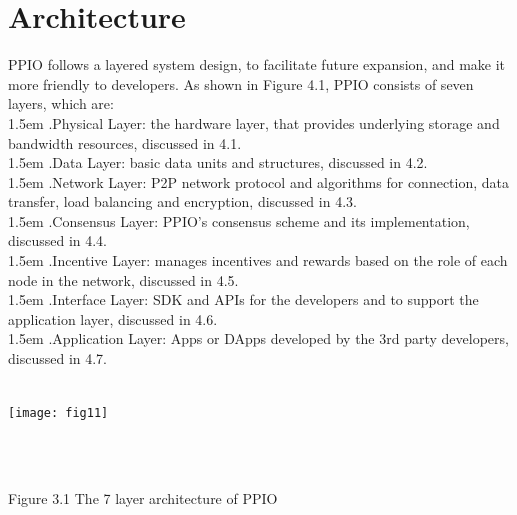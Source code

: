 \documentclass[10pt,a4paper]{article}
\begin{document}
    \section{Architecture} %
PPIO follows a layered system design, to facilitate future expansion, and make it more friendly to developers. As shown in Figure 4.1, PPIO consists of seven layers, which are:
\vspace{-0.5em}
 \\


\hangindent 1.5em
.\quad  Physical Layer: the hardware layer, that provides underlying storage and bandwidth resources, discussed in 4.1.
\vspace{-0.8em}
\\


\hangindent 1.5em
.\quad Data Layer: basic data units and structures, discussed in 4.2.
\vspace{-0.8em}
\\


\hangindent 1.5em
.\quad Network Layer: P2P network protocol and algorithms for connection, data transfer, load balancing and encryption, discussed in 4.3.
\vspace{-0.8em}
\\

\hangindent 1.5em
.\quad Consensus Layer: PPIO’s consensus scheme and its implementation, discussed in 4.4.
\vspace{-0.8em}
\\

\hangindent 1.5em
.\quad Incentive Layer: manages incentives and rewards based on the role of each node in the network, discussed in 4.5.
\vspace{-0.8em}
\\

\hangindent 1.5em
.\quad Interface Layer: SDK and APIs for the developers and to support the application layer, discussed in 4.6.
\vspace{-0.8em}
\\

\hangindent 1.5em
.\quad Application Layer: Apps or DApps developed by the 3rd party developers, discussed in 4.7.
\vspace{-0.3em}
 \\ \\
\centerline{\texttt{[image: fig11]}}
\vspace{-1.5em}
\\\\
 \centerline{{Figure 3.1 The 7 layer architecture of PPIO}}
\vspace{-1.5em}
\end{document}
